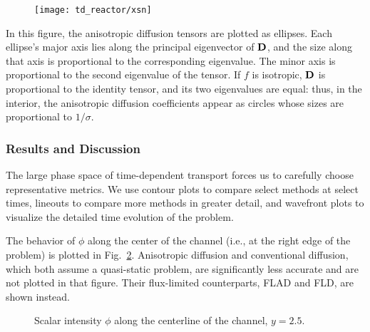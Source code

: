 \begin{figure}[bp]
  \centering
  \texttt{[image: td\_reactor/xsn]}
  \label{fig:tdReactorProblem}
\end{figure}

In this figure, the anisotropic diffusion tensors are plotted as ellipses. Each
ellipse's major axis
lies along the principal eigenvector of $\mathbf{D}$, and the size along that axis is
proportional to the corresponding eigenvalue. The minor axis is proportional to
the second eigenvalue of the tensor. If $f$ is isotropic, $\mathbf{D}$ is
proportional to the identity tensor, and its two eigenvalues are equal: thus, in
the interior, the anisotropic diffusion coefficients appear as circles whose
sizes are proportional to $1/\sigma$.

\subsubsection{Results and Discussion}

The large phase space of time-dependent transport forces us to carefully choose
representative metrics. We use contour plots to compare select methods at
select times, lineouts to compare more methods in greater detail, and wavefront
plots to visualize the detailed time evolution of the problem.

The behavior of $\phi$ along the center of the channel (i.e., at the
right edge of the problem) is plotted in Fig.~\ref{fig:tdReactor}. Anisotropic
diffusion and conventional diffusion, which both assume a quasi-static problem,
are significantly less accurate and are not plotted in that figure. Their
flux-limited counterparts, FLAD and FLD, are shown instead.

\begin{figure}[htb]
  \centering\small
  \subfloat[$t=2$]{%
    \hspace{-.25in}%
    }%
  \subfloat[$t=5$]{%
    \hspace{-.25in}%
    }

  \subfloat[$t=10$]{%
    \hspace{-.25in}%
    }%
  \subfloat[$t=15$]{%
    \hspace{-.25in}%
    }

  \caption{Scalar intensity $\phi$ along the centerline of the channel, $y=2.5$.}
  \label{fig:tdReactor}
\end{figure}

